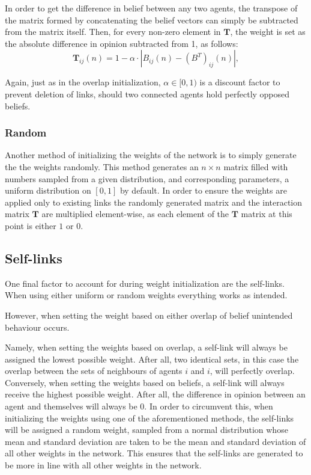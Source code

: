 \documentclass[a4paper, 12pt]{report}
\newcommand{\T}{\bm{T}}
\begin{document}
\noindent In order to get the difference in belief between any two agents, the transpose of the matrix formed by concatenating the belief vectors can simply be subtracted from the matrix itself. Then, for every non-zero element in $\T$, the weight is set as the absolute difference in opinion subtracted from 1, as follows:
\begin{equation*}
    \T_{ij}(n) = 1 - \alpha \cdot |B_{ij}(n) - (B^{T})_{ij}(n)|,
\end{equation*}

\noindent Again, just as in the overlap initialization, $\alpha \in [0, 1)$ is a discount factor to prevent deletion of links, should two connected agents hold perfectly opposed beliefs.

\subsubsection{Random}

Another method of initializing the weights of the network is to simply generate the the weights randomly. This method generates an $n \times n$ matrix filled with numbers sampled from a given distribution, and corresponding parameters, a uniform distribution on $[0, 1]$ by default. In order to ensure the weights are applied only to existing links the randomly generated matrix and the interaction matrix $\T$ are multiplied element-wise, as each element of the $\T$ matrix at this point is either $1$ or $0$.

\subsection{Self-links}

One final factor to account for during weight initialization are the self-links. When using either uniform or random weights everything works as intended. 

\noindent However, when setting the weight based on either overlap of belief unintended behaviour occurs. 

\noindent Namely, when setting the weights based on overlap, a self-link will always be assigned the lowest possible weight. After all, two identical sets, in this case the overlap between the sets of neighbours of agents $i$ and $i$, will perfectly overlap.
Conversely, when setting the weights based on beliefs, a self-link will always receive the highest possible weight. After all, the difference in opinion between an agent and themselves will always be $0$. \newline
In order to circumvent this, when initializing the weights using one of the aforementioned methods, the self-links will be assigned a random weight, sampled from a normal distribution whose mean and standard deviation are taken to be the mean and standard deviation of all other weights in the network. This ensures that the self-links are generated to be more in line with all other weights in the network.
\end{document}
